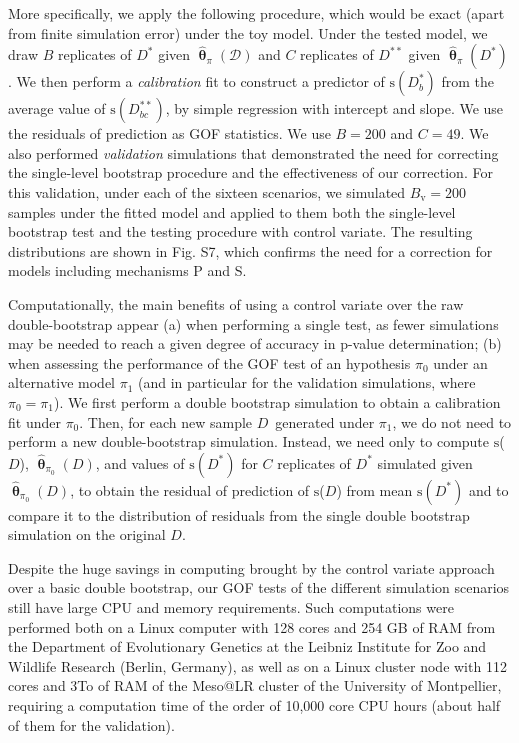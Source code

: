 \documentclass[a4paper]{article}\usepackage[]{graphicx}\usepackage[]{color}
\newcommand{\adata}{\ensuremath{\mathcal{D}}}
\newcommand{\data}{\ensuremath{D}}
\newcommand{\datab}{\ensuremath{D_{b}^*}}
\newcommand{\databb}{\ensuremath{D_{bc}^{**}}}
\newcommand{\sfn}{\ensuremath{\mathrm{s}}}
\newcommand{\bth}{\ensuremath{\bm{\uptheta}}}
\begin{document}
More specifically, we apply the following procedure, which would be exact (apart from finite simulation error) under the toy model. Under the tested model, we draw $B$ replicates of $\data^*$ given $\hat{\bth}_\pi(\adata)$ and $C$ replicates of $\data^{**}$ given $\hat{\bth}_\pi(\data^*)$. We then perform a \emph{calibration} fit to construct a predictor of $\sfn(\datab)$ from the average value of $\sfn(\databb)$, by simple regression with intercept and slope. We use the residuals of prediction as GOF statistics. We use $B=200$ and $C=49$. We also performed \emph{validation} simulations that demonstrated the need for correcting the single-level bootstrap procedure and the effectiveness of our correction. For this validation, under each of the sixteen scenarios, we simulated $B_{\mathrm{v}}=200$ samples under the fitted model and applied to them both the single-level bootstrap test and the testing procedure with control variate. The resulting distributions are shown in Fig. S7, which confirms the need for a correction for models including mechanisms P and S.

Computationally, the main benefits of using a control variate over the raw double-bootstrap appear (a) when performing a single test, as fewer simulations may be needed to reach a given degree of accuracy in p-value determination; (b) when assessing the performance of the GOF test of an hypothesis $\pi_0$ under an alternative model $\pi_1$ (and in particular for the validation simulations, where $\pi_0 = \pi_1$). We first perform a double bootstrap simulation to obtain a calibration fit under $\pi_0$. Then, for each new sample \data\ generated under $\pi_1$, we do not need to perform a new double-bootstrap simulation. Instead, we need only to compute \sfn(\data), $\hat{\bth}_{\pi_0}(\data)$, and values of $\sfn(\data^*)$ for $C$ replicates of $\data^*$ simulated given $\hat{\bth}_{\pi_0}(\data)$, to obtain the residual of prediction of \sfn(\data)  from mean $\sfn(\data^*)$ and to compare it to the distribution of residuals from the single double bootstrap simulation on the original \data.

Despite the huge savings in computing brought by the control variate approach over a basic double bootstrap, our GOF tests of the different simulation scenarios still have large CPU and memory requirements. Such computations were performed both on a Linux computer with 128 cores and 254 GB of RAM from the Department of Evolutionary Genetics at the Leibniz Institute for Zoo and Wildlife Research (Berlin, Germany), as well as on a Linux cluster node with 112 cores and 3To of RAM of the Meso@LR cluster of the University of Montpellier, requiring a computation time of the order of 10,000 core CPU hours (about half of them for the validation).
\end{document}
